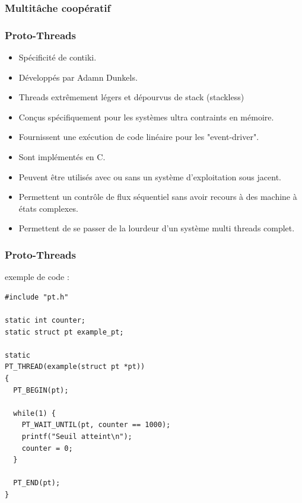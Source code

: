 \documentclass{smilebeamer}
\begin{document}
\begin{frame}
\frametitle{Multitâche coopératif}


\end{frame}


\begin{frame}

\frametitle{Proto-Threads}
\begin{itemize}
\item Spécificité de contiki.
\item Développés par Adamn Dunkels.
\item  Threads extrêmement légers et dépourvus de stack (stackless)
\item  Conçus spécifiquement pour les systèmes ultra contraints en mémoire.
\item  Fournissent une exécution de code linéaire pour les "event-driver".
\item  Sont implémentés en C.
\item Peuvent être utilisés avec ou sans un système d'exploitation sous jacent.
\item Permettent un contrôle de flux séquentiel sans avoir recours à des machine à états complexes.
\item Permettent de se passer de la lourdeur d'un système multi threads complet.
\end{itemize}
\end{frame}


\begin{frame}[containsverbatim]

\frametitle{Proto-Threads}

exemple de code :
  \begin{verbatim}
#include "pt.h"

static int counter;
static struct pt example_pt;

static
PT_THREAD(example(struct pt *pt))
{
  PT_BEGIN(pt);

  while(1) {
    PT_WAIT_UNTIL(pt, counter == 1000);
    printf("Seuil atteint\n");
    counter = 0;
  }

  PT_END(pt);
}
  \end{verbatim}
\end{frame}
\end{document}
